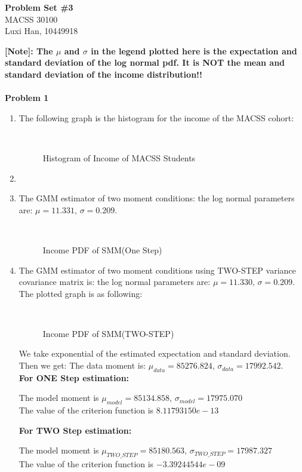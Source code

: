 \documentclass[letterpaper,12pt]{article}
\theoremstyle{definition}
\numberwithin{equation}{section}
\begin{document}
\begin{flushleft}
   \textbf{\Large{Problem Set \#3}} \\
   MACSS 30100 \\
   Luxi Han, 10449918\\
\end{flushleft}

\textbf{[Note]: The \(\mu\) and \(\sigma\) in the legend plotted here is the expectation and standard deviation of the log normal pdf. It is NOT the mean and standard deviation of the income distribution!!}\, \, \\
\, \\

\noindent \textbf{\large Problem 1}\par

\begin{enumerate} [\bfseries (a)]
\item The following graph is the histogram for the income of the MACSS cohort:\\
	\begin{figure}[H]
    		\centering
		\
    		\caption{Histogram of Income of MACSS Students}
	\end{figure}\par
\item \quad
\item The GMM estimator of two moment conditions: the log normal parameters are: \(\mu = 11.331, \, \sigma = 0.209\). \\
	\begin{figure}[H]
    		\centering
		\fbox{\resizebox{5in}{3in}{\texttt{[image: 1c]}}}\
    		\caption{Income PDF of SMM(One Step)}
	\end{figure}\par

\item The GMM estimator of two moment conditions using TWO-STEP variance covariance matrix is: the log normal parameters are: \(\mu = 11.330, \, \sigma = 0.209\). \\
The plotted graph is as following:\\
	\begin{figure}[H]
    		\centering
		\fbox{\resizebox{5in}{3in}{\texttt{[image: 1d]}}}\
    		\caption{Income PDF of SMM(TWO-STEP)}
	\end{figure}\par
We take exponential of the estimated expectation and standard deviation. Then we get:
The data moment is: \(\mu_{data} = 85276.824, \, \sigma_{data} = 17992.542\).\\
\textbf{For ONE Step estimation:}\par
The model moment is \(\mu_{model} = 85134.858, \, \sigma_{model} = 17975.070\)\\
The value of the criterion function is \(8.11793150e-13\)\par
\textbf{For TWO Step estimation:}\par
The model moment is \(\mu_{TWO\_STEP} = 85180.563, \, \sigma_{TWO\_STEP} = 17987.327\)\\
The value of the criterion function is \(-3.39244544e-09\)\par


\end{enumerate}
\end{document}
